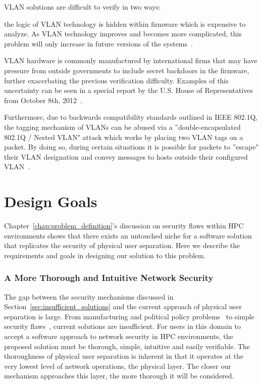 \documentclass[oneside,12pt]{memoir}
\begin{document}
VLAN solutions are difficult to verify in two ways:
\begin{inparaenum} 
\item the logic of VLAN technology is hidden within firmware which is expensive to analyze. As VLAN technology improves and becomes more complicated, this problem will only increase in future versions of the systems~\cite{emery2011security}\cite{kloth2001derived}.
\item VLAN hardware is commonly manufactured by international firms that may have pressure from outside governments to include secret backdoors in the firmware, further exacerbating the previous verification difficulty. Examples of this uncertainty can be seen in a special report by the U.S. House of Representatives from October 8th, 2012~\cite{huawei}.
\end{inparaenum}

Furthermore, due to backwards compatibility standards outlined in IEEE 802.1Q, the tagging mechanism of VLANs can be abused via a ''double-encapsulated 802.1Q / Nested VLAN" attack which works by placing two VLAN tags on a packet. By doing so, during certain situations it is possible for packets to ''escape" their VLAN designation and convey messages to hosts outside their configured VLAN~\cite{cisco_vlan_whitepaper}.

\chapter{Design Goals}
Chapter~\ref{chap:problem_definition}'s discussion on security flaws within HPC environments shows that there exists an untouched niche for a software solution that replicates the security of physical user separation. Here we describe the requirements and goals in designing our solution to this problem.
\subsection{A More Thorough and Intuitive Network Security}
The gap between the security mechanisms discussed in Section~\ref{sec:insufficient_solutions} and the current approach of physical user separation is large. From manufacturing and political policy problems~\cite{huawei} to simple security flaws~\cite{cisco_vlan_whitepaper}, current solutions are insufficient. For users in this domain to accept a software approach to network security in HPC environments, the proposed solution must be thorough, simple, intuitive and easily verifiable. The thoroughness of physical user separation is inherent in that it operates at the very lowest level of network operations, the physical layer. The closer our mechanism approaches this layer, the more thorough it will be considered.
\end{document}
